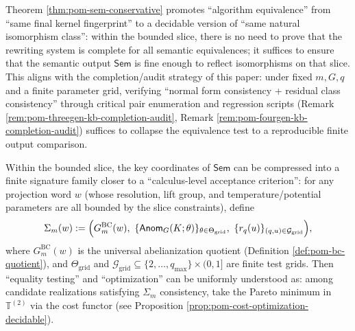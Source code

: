 \begin{remark}\label{rem:pom-sem-conservative-meaning}
Theorem \ref{thm:pom-sem-conservative} promotes ``algorithm equivalence'' from ``same final kernel fingerprint'' to a decidable version of ``same natural isomorphism class'':
within the bounded slice, there is no need to prove that the rewriting system is complete for all semantic equivalences; it suffices to ensure that the semantic output \(\mathsf{Sem}\) is fine enough to reflect isomorphisms on that slice.
This aligns with the completion/audit strategy of this paper: under fixed \(m,G,q\) and a finite parameter grid, verifying ``normal form consistency + residual class consistency'' through critical pair enumeration and regression scripts (Remark \ref{rem:pom-threegen-kb-completion-audit}, Remark \ref{rem:pom-fourgen-kb-completion-audit}) suffices to collapse the equivalence test to a reproducible finite output comparison.
\end{remark}

\begin{remark}\label{rem:pom-finite-signature-sigmam}
Within the bounded slice, the key coordinates of \(\mathsf{Sem}\) can be compressed into a finite signature family closer to a ``calculus-level acceptance criterion'':
for any projection word \(w\) (whose resolution, lift group, and temperature/potential parameters are all bounded by the slice constraints), define
\[
\Sigma_m(w)
:=
\Bigl(
G^{\mathrm{BC}}_m(w),\
\{\mathsf{Anom}_{G}(K;\theta)\}_{\theta\in\Theta_{\mathrm{grid}}},\
\{r_q(u)\}_{(q,u)\in\mathcal{G}_{\mathrm{grid}}}
\Bigr),
\]
where \(G^{\mathrm{BC}}_m(w)\) is the universal abelianization quotient (Definition \ref{def:pom-bc-quotient}), and \(\Theta_{\mathrm{grid}}\) and \(\mathcal{G}_{\mathrm{grid}}\subseteq\{2,\dots,q_{\max}\}\times(0,1]\) are finite test grids.
Then ``equality testing'' and ``optimization'' can be uniformly understood as: among candidate realizations satisfying \(\Sigma_m\) consistency, take the Pareto minimum in \(\mathbb{T}^{(2)}\) via the cost functor (see Proposition \ref{prop:pom-cost-optimization-decidable}).
\end{remark}

